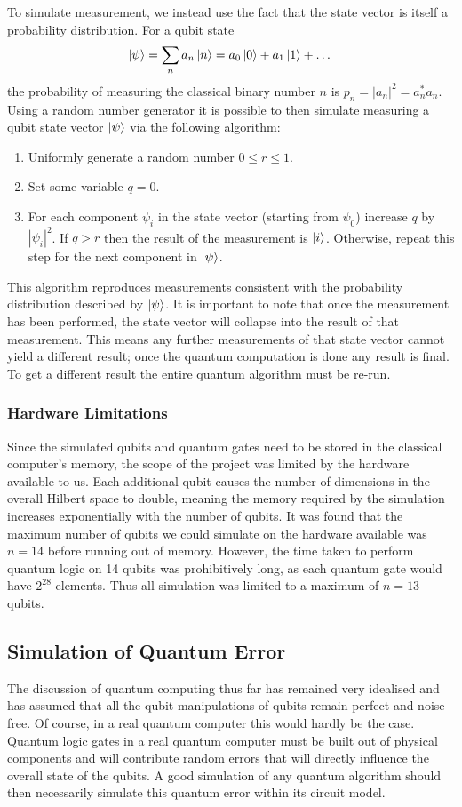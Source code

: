 \documentclass{article}[11pt]
\begin{document}
To simulate measurement, we instead use the fact that the state vector is itself a probability distribution. For a qubit state
\begin{equation}
\ket\psi=\sum_{n}a_n\ket{n}=a_{0}\ket{0}+a_{1}\ket{1}+\dots
\end{equation}
the probability of measuring the classical binary number $n$ is $p_n=|a_n|^2=a_n^*a_n$.\cite{griffiths} Using a random number generator it is possible to then simulate measuring a qubit state vector $\ket\psi$ via the following algorithm:\cite{candela} 
\begin{enumerate}
    \item Uniformly generate a random number $0\leq r\leq1$.
    \item Set some variable $q=0$.
    \item For each component $\psi_i$ in the state vector (starting from $\psi_0$) increase $q$ by $|\psi_i|^2$. If $q>r$ then the result of the measurement is $\ket i$. Otherwise, repeat this step for the next component in $\ket\psi$.
\end{enumerate}
This algorithm reproduces measurements consistent with the probability distribution described by $\ket\psi$. It is important to note that once the measurement has been performed, the state vector will collapse into the result of that measurement.\cite{griffiths} This means any further measurements of that state vector cannot yield a different result; once the quantum computation is done any result is final. To get a different result the entire quantum algorithm must be re-run.

\subsubsection{Hardware Limitations}
Since the simulated qubits and quantum gates need to be stored in the classical computer's memory, the scope of the project was limited by the hardware available to us. Each additional qubit causes the number of dimensions in the overall Hilbert space to double, meaning the memory required by the simulation increases exponentially with the number of qubits. It was found that the maximum number of qubits we could simulate on the hardware available was $n=14$ before running out of memory. However, the time taken to perform quantum logic on 14 qubits was prohibitively long, as each quantum gate would have $2^{28}$ elements. Thus all simulation was limited to a maximum of $n=13$ qubits.

\subsection{Simulation of Quantum Error}\label{section:error_intro}
The discussion of quantum computing thus far has remained very idealised and has assumed that all the qubit manipulations of qubits remain perfect and noise-free. Of course, in a real quantum computer this would hardly be the case. Quantum logic gates in a real quantum computer must be built out of physical components and will contribute random errors that will directly influence the overall state of the qubits.\cite{nielsenChuang} A good simulation of any quantum algorithm should then necessarily simulate this quantum error within its circuit model.
\end{document}

